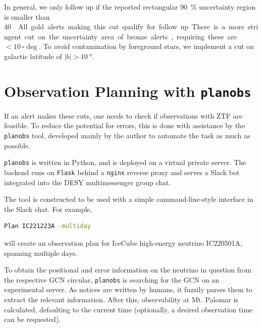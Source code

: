 \documentclass[
    a4paper, %
    fontsize=10pt, %
    twoside=true, %
    numbers=noenddot, %
    fontmethod=tex,
]{kaobook}
\begin{document}
In general, we only follow up if the reported rectangular \SI{90}{\percent} uncertainty region is smaller than \SI{40}{\square\deg}. All gold alerts making this cut qualify for follow up. There is a more stringent cut on the uncertainty area of bronze alerts, requiring these are $<\SI{10}{\square\deg}$. To avoid contamination by foreground stars, we implement a cut on galactic latitude of $|b|>\SI{10}{\degree}$.

\section{Observation Planning with \texttt{planobs}}\label{planobs}
If an alert makes these cuts, one needs to check if observations with ZTF are feasible. To reduce the potential for errors, this is done with assistance by the \texttt{planobs}  tool, developed mainly by the author to automate the task as much as possible.

\texttt{planobs} is written in Python, and is deployed on a virtual private server. The backend runs on \texttt{Flask} behind a \texttt{nginx} reverse proxy and serves a Slack bot integrated into the DESY multimessenger group chat.

The tool is constructed to be used with a simple command-line-style interface in the Slack chat. For example, 
\begin{lstlisting}[language=bash,style=kaolstplain]
Plan IC221223A -multiday
\end{lstlisting}
will create an observation plan for IceCube high-energy neutrino IC220501A, spanning multiple days.

To obtain the positional and error information on the neutrino in question from the respective GCN circular, \texttt{planobs} is searching for the GCN on an experimental server. As notices are written by humans, it fuzzily parses them to extract the relevant information. After this, observability at Mt. Palomar is calculated, defaulting to the current time (optionally, a desired observation time can be requested). 
\end{document}
